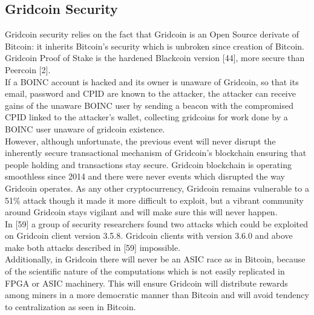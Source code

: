 \subsection{Gridcoin Security}

Gridcoin security relies on the fact that Gridcoin is an Open Source derivate of Bitcoin: it inherits Bitcoin's security which is unbroken since creation of Bitcoin. Gridcoin Proof of Stake is the hardened Blackcoin version [44], more secure than Peercoin [2].\\ 

If a BOINC account is hacked and its owner is unaware of Gridcoin, so that its email, password and CPID are known to the attacker, the attacker can receive gains of the unaware BOINC user by sending a beacon with the compromised CPID linked to the attacker's wallet, collecting gridcoins for work done by a BOINC user unaware of gridcoin existence.\\

However, although unfortunate, the previous event will never disrupt the inherently secure transactional mechanism of Gridcoin's blockchain ensuring that people holding and transactions stay secure. Gridcoin blockchain is operating smoothless since 2014 and there were never events which disrupted the way Gridcoin operates. As any other cryptocurrency, Gridcoin remains vulnerable to a 51\% attack though it made it more difficult to exploit, but a vibrant community around Gridcoin stays vigilant and will make sure this will never happen.\\

In [59] a group of security researchers found two attacks which could be exploited on Gridcoin client version 3.5.8. Gridcoin clients with version 3.6.0 and above make both attacks described in [59] impossible.\\

Additionally, in Gridcoin there will never be an ASIC race as in Bitcoin, because of the scientific nature of the computations which is not easily replicated in FPGA or ASIC machinery. This will ensure Gridcoin will distribute rewards among miners in a more democratic manner than Bitcoin and will avoid tendency to centralization as seen in Bitcoin.